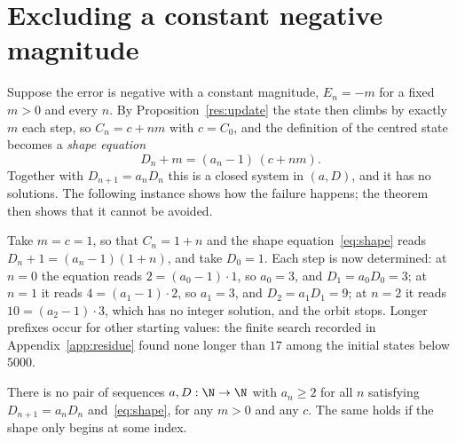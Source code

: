 \appendix
\section{Excluding a constant negative magnitude}\label{sec:constant}

Suppose the error is negative with a constant magnitude, $E_n=-m$ for a fixed
$m>0$ and every $n$.  By
Proposition~\ref{res:update} the state then climbs by exactly $m$ each step,
so $C_n=c+nm$ with $c=C_0$, and the definition of the centred state becomes a
\emph{shape equation}
\[
 D_n+m=(a_n-1)\,(c+nm) .
\tag{5.1}\label{eq:shape}
\]
Together with $D_{n+1}=a_nD_n$ this is a closed system in $(a,D)$, and it has
no solutions.  The following instance shows how the failure happens; the
theorem then shows that it cannot be avoided.

\begin{example}\label{ex:shape}
Take $m=c=1$, so that $C_n=1+n$ and the shape equation~\eqref{eq:shape} reads
$D_n+1=(a_n-1)(1+n)$, and take $D_0=1$.  Each step is now determined: at $n=0$
the equation reads $2=(a_0-1)\cdot1$, so $a_0=3$, and $D_1=a_0D_0=3$; at $n=1$
it reads $4=(a_1-1)\cdot2$, so $a_1=3$, and $D_2=a_1D_1=9$; at $n=2$ it reads
$10=(a_2-1)\cdot3$, which has no integer solution, and the orbit stops.
Longer prefixes occur for other starting values: the finite search recorded in
Appendix~\ref{app:residue} found none longer than $17$ among the initial
states below $5000$.
\end{example}

\begin{theorem}\label{res:constant}
There is no pair of sequences $a,D:\N\to\N$ with $a_n\ge2$ for all $n$
satisfying $D_{n+1}=a_nD_n$ and~\eqref{eq:shape}, for any $m>0$ and any
$c$.  The same holds if the shape only begins at some index.
\end{theorem}

